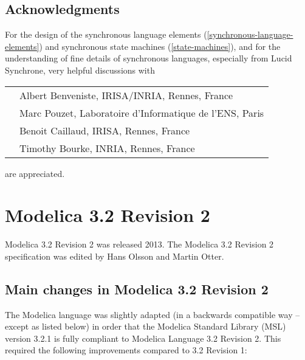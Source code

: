 \subsection{Acknowledgments}

For the design of the synchronous language elements (\autoref{synchronous-language-elements}) and
synchronous state machines (\autoref{state-machines}), and for the understanding of
fine details of synchronous languages, especially from Lucid Synchrone,
very helpful discussions with

\begin{longtable}{p{0.3cm}p{14cm}}
&Albert Benveniste, IRISA/INRIA, Rennes, France\\
&Marc Pouzet, Laboratoire d'Informatique de l'ENS, Paris\\
&Benoit Caillaud, IRISA, Rennes, France\\
&Timothy Bourke, INRIA, Rennes, France
\end{longtable}
are appreciated.

\section{Modelica 3.2 Revision 2}

Modelica 3.2 Revision 2 was released 2013. The Modelica 3.2 Revision 2
specification was edited by Hans Olsson and Martin Otter.

\subsection{Main changes in Modelica 3.2 Revision 2}

The Modelica language was slightly adapted (in a backwards compatible
way -- except as listed below) in order that the Modelica Standard
Library (MSL) version 3.2.1 is fully compliant to Modelica Language 3.2
Revision 2. This required the following improvements compared to 3.2
Revision 1:

